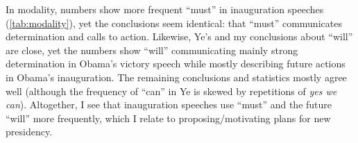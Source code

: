 \documentclass[11pt]{article}
\begin{document}
{	%
	
	In modality, numbers show more frequent ``must'' in inauguration speeches (\autoref{tab:modality}), yet the conclusions seem identical: that ``must'' communicates determination and calls to action.
	Likewise, Ye's and my conclusions about ``will'' are close, yet the numbers show ``will'' communicating mainly strong determination in Obama's victory speech while mostly describing future actions in Obama's inauguration.
	The remaining conclusions and statistics mostly agree well (although the frequency of ``can'' in Ye is skewed by repetitions of \textit{yes we can}).
	Altogether, I see that inauguration speeches use ``must'' and the future ``will'' more frequently, which I relate to proposing/motivating plans for new presidency. 



}
\end{document}
